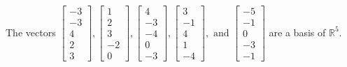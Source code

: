 \begin{exercise}
\begin{exerciseStatement}
  \end{exerciseStatement}
  \begin{exerciseAnswer}
   The vectors \(\left[\begin{array}{r}
-3 \\
-3 \\
4 \\
2 \\
3
\end{array}\right] , \left[\begin{array}{r}
1 \\
2 \\
3 \\
-2 \\
0
\end{array}\right] , \left[\begin{array}{r}
4 \\
-3 \\
-4 \\
0 \\
-3
\end{array}\right] , \left[\begin{array}{r}
3 \\
-1 \\
4 \\
1 \\
-4
\end{array}\right] , \text{ and } \left[\begin{array}{r}
-5 \\
-1 \\
0 \\
-3 \\
-1
\end{array}\right]\) 
  	 are  a basis of \(\mathbb{R}^5\).
  


  \end{exerciseAnswer}
\end{exercise}